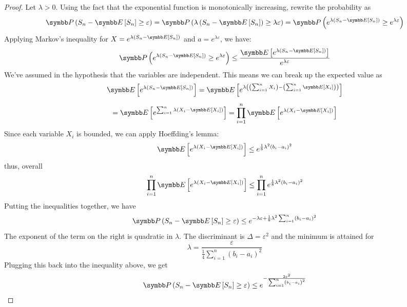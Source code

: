 \begin{proof}
Let \(\lambda > 0\). Using the fact that the exponential function is monotonically increasing, rewrite the probability as
\[
    \probability\left(S_n - \expectedvalue\left[S_n\right] \geq \varepsilon\right) = \probability\left(\lambda \left(S_n - \expectedvalue\left[S_n\right]\right) \geq \lambda \varepsilon\right) = \probability\left(e^{\lambda \left(S_n - \expectedvalue\left[S_n\right]\right)} \geq e^{\lambda \varepsilon}\right)
\]
Applying Markov's inequality for \(X = e^{\lambda (S_n - \expectedvalue\left[S_n\right])}\) and \(a = e^{\lambda \varepsilon}\), we have:
\[
    \probability\left(e^{\lambda \left(S_n - \expectedvalue\left[S_n\right]\right)} \geq e^{\lambda \varepsilon}\right) \leq \frac{\expectedvalue\left[e^{\lambda \left(S_n - \expectedvalue\left[S_n\right]\right)}\right]}{e^{\lambda \varepsilon}}
\]
We've assumed in the hypothesis that the variables are independent. This means we can break up the expected value as
\begin{gather*}
    \expectedvalue\left[e^{\lambda \left(S_n - \expectedvalue\left[S_n\right]\right)}\right]
    = \expectedvalue\left[e^{\lambda \left(\left(\sum_{i = 1}^{n} X_i\right) - \left(\sum_{i = 1}^{n} \expectedvalue\left[X_i\right]\right)\right)}\right] \\[0.5em]
    = \expectedvalue\left[e^{\sum_{i = 1}^{n} \lambda \left(X_i - \expectedvalue\left[X_i\right]\right)}\right]
    = \prod_{i = 1}^{n} \expectedvalue\left[e^{\lambda \left(X_i - \expectedvalue\left[X_i\right]\right)}\right]
\end{gather*}
Since each variable \(X_i\) is bounded, we can apply Hoeffding's lemma:
\[
    \expectedvalue\left[e^{\lambda \left(X_i - \expectedvalue\left[X_i\right]\right)}\right] \leq e^{\frac{1}{8} \lambda^2 \left(b_i - a_i\right)^2}
\]
thus, overall
\[
    \prod_{i = 1}^{n} \expectedvalue\left[e^{\lambda \left(X_i - \expectedvalue\left[X_i\right]\right)}\right]
    \leq
    \prod_{i = 1}^{n} e^{\frac{1}{8} \lambda^2 \left(b_i - a_i\right)^2}
\]
Putting the inequalities together, we have
\[
    \probability\left(S_n - \expectedvalue\left[S_n\right] \geq \varepsilon\right) \leq e^{- \lambda \varepsilon + \frac{1}{8} \lambda^2 \sum_{i = 1}^{n} \left(b_i - a_i\right)^2}
\]
The exponent of the term on the right is quadratic in \(\lambda\). The discriminant is \(\Delta = \varepsilon^2\) and the minimum is attained for
\[
    \lambda = \frac{\varepsilon}{\frac{1}{4} \sum_{i = 1}^{n} \left(b_i - a_i\right)^2}
\]
Plugging this back into the inequality above, we get
\[
    \probability\left(S_n - \expectedvalue\left[S_n\right] \geq \varepsilon\right) \leq e^{- \frac{2 \varepsilon^2}{\sum_{i = 1}^{n} \left(b_i - a_i\right)^2}}
\]
\end{proof}
